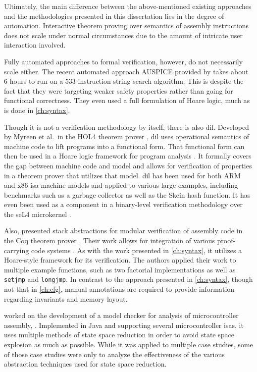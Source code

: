 Ultimately, the main difference between the above-mentioned existing approaches
and the methodologies presented in this dissertation lies in the degree of automation.
Interactive theorem proving over semantics of assembly instructions
does not scale under normal circumstances
due to the amount of intricate user interaction involved.

Fully automated approaches to formal verification, however,
do not necessarily scale either.
The recent automated approach AUSPICE provided by \textcite{tan2015auspice}
takes about 6 hours to run on a 533-instruction string search algorithm.
This is despite the fact that they were targeting weaker safety properties
rather than going for functional correctness.
They even used a full formulation of Hoare logic, much as is done in \cref{ch:syntax}.

Though it is not a verification methodology by itself,
there is also \ac{dil}.
Developed by Myreen et al.\ in the HOL4 theorem prover \autocite{slind2008brief},
\ac{dil} uses operational semantics of machine code
to lift programs into a functional form.
That functional form can then be used in a Hoare logic framework
for program analysis \autocite{myreen2007hoare}.
It formally covers the gap between machine code and  model
and allows for verification of properties in a theorem prover that utilizes that model.
\Ac{dil} has been used for both ARM and x86 \ac{isa} machine models
and applied to various large examples,
including benchmarks such as a garbage collector as well as the Skein hash function.
It has even been used as a component in a binary-level verification methodology
over the seL4 microkernel \autocite{sewell2013tvv}.

Also, \textcite{feng2006modular,feng2005sbca} presented stack abstractions
for modular verification of assembly code
in the Coq theorem prover \autocite{chlipala2013certified}.
Their work allows for integration
of various proof-carrying code systems \autocite{necula1997proof}.
As with the work presented in \cref{ch:syntax},
it utilizes a Hoare-style framework for its verification.
The authors applied their work to multiple example functions,
such as two factorial implementations
as well as \lstinline[style=C]|setjmp| and \lstinline[style=C]|longjmp|.
In contrast to the approach presented in \cref{ch:syntax},
though not that in \cref{ch:cfg},
manual annotations are required to provide information
regarding invariants and memory layout.

\Textcite{schlich2008phd} worked on the development of a model checker for analysis
of microcontroller assembly, \mcsquare.
Implemented in Java and supporting several microcontroller \acp{isa},
it uses multiple methods of state space reduction in order to avoid state space explosion
as much as possible. While it was applied to multiple case studies,
some of those case studies were only to analyze the effectiveness
of the various abstraction techniques used for state space reduction.


